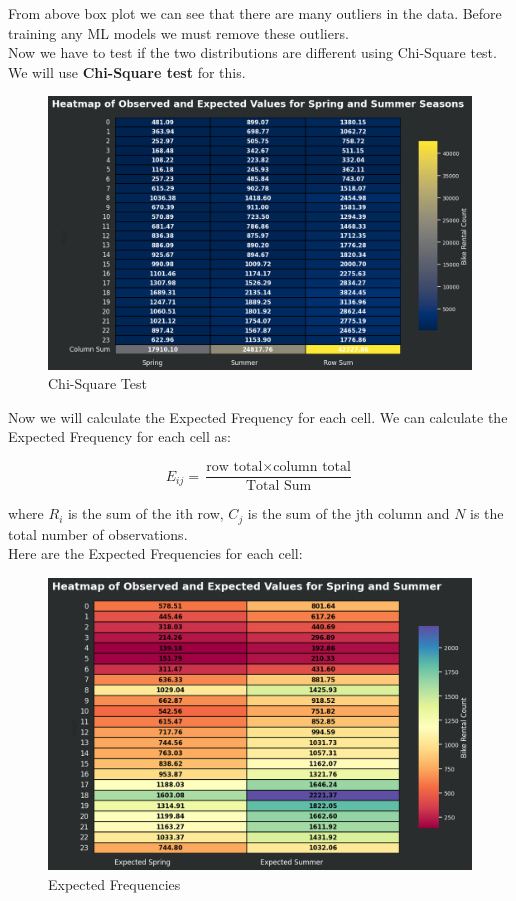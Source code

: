 \documentclass[12pt, letterpaper]{article}
\begin{document}
\newpage
From above box plot we can see that there are many outliers in the data. Before training any ML models we must remove these outliers. \\

Now we have to test if the two distributions are different using Chi-Square test. We will use \textbf{Chi-Square test} for this. \\

\begin{figure}[h]
    \centering
    \includegraphics[width=1\textwidth]{heatmap2.png}
    \caption{Chi-Square Test}
\end{figure}

\newpage    

Now we will calculate the Expected Frequency for each cell. We can calculate the Expected Frequency for each cell as:

\[ \boxed{E_{ij} = \frac{\text{row total} \times \text{column total}}{\text{Total Sum}}} \]

where $R_i$ is the sum of the ith row, $C_j$ is the sum of the jth column and $N$ is the total number of observations. \\

Here are the Expected Frequencies for each cell:
\begin{figure}
    \centering
    \includegraphics[width=1\textwidth]{heatmap3.png}
    \caption{Expected Frequencies}
\end{figure}
\end{document}
